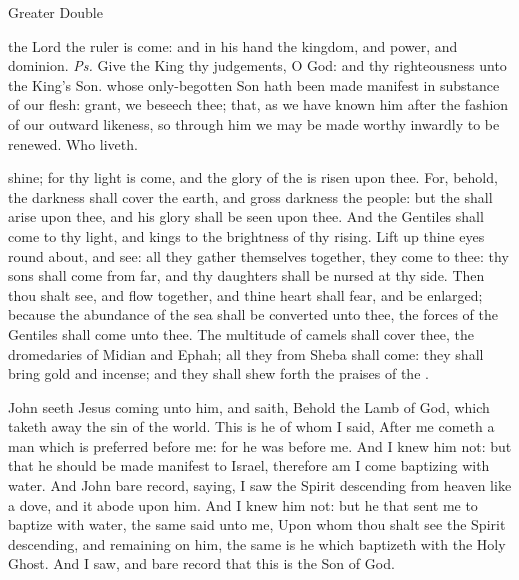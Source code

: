 \begin{inhead}
{Greater Double}
\end{inhead}

\properantiphonfix

\introit
{} the Lord the ruler is come: and in his hand the kingdom, and power, and dominion. \textit{Ps.} Give the King thy judgements, O God: and thy righteousness unto the King's Son.
\collect
{} whose only-begotten Son hath been made manifest in substance of our flesh: grant, we beseech thee; that, as we have known him after the fashion of our outward likeness, so through him we may be made worthy inwardly to be renewed. Who liveth.

 shine; for thy light is come, and the glory of the  is risen upon thee. For, behold, the darkness shall cover the earth, and gross darkness the people: but the  shall arise upon thee, and his glory shall be seen upon thee. And the Gentiles shall come to thy light, and kings to the brightness of thy rising. Lift up thine eyes round about, and see: all they gather themselves together, they come to thee: thy sons shall come from far, and thy daughters shall be nursed at thy side. Then thou shalt see, and flow together, and thine heart shall fear, and be enlarged; because the abundance of the sea shall be converted unto thee, the forces of the Gentiles shall come unto thee. The multitude of camels shall cover thee, the dromedaries of Midian and Ephah; all they from Sheba shall come: they shall bring gold and incense; and they shall shew forth the praises of the .



 John seeth Jesus coming unto him, and saith, Behold the Lamb of God, which taketh away the sin of the world. This is he of whom I said, After me cometh a man which is preferred before me: for he was before me. And I knew him not: but that he should be made manifest to Israel, therefore am I come baptizing with water. And John bare record, saying, I saw the Spirit descending from heaven like a dove, and it abode upon him. And I knew him not: but he that sent me to baptize with water, the same said unto me, Upon whom thou shalt see the Spirit descending, and remaining on him, the same is he which baptizeth with the Holy Ghost. And I saw, and bare record that this is the Son of God.

